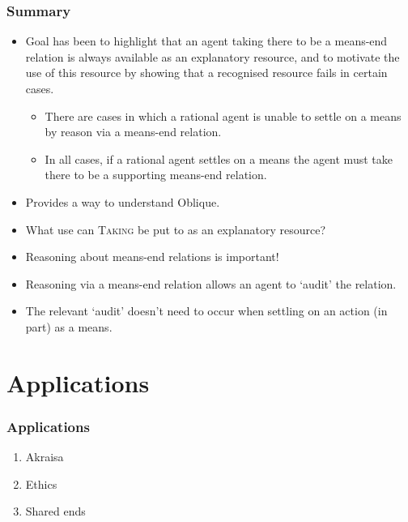 \documentclass[noamssymb,
graphics,
]{beamer} %
\newcommand{\schemaName}[1]{\textsc{#1}}
\newcommand{\hozlinedash}[0]{
  \noindent\hdashrule[0.5ex][c]{\textwidth}{.1pt}{2.5pt}
}
\begin{document}
\begin{frame}
  \frametitle{Summary}
  \begin{itemize}
  \item Goal has been to highlight that an agent taking there to be a means-end relation is always available as an explanatory resource, and to motivate the use of this resource by showing that a recognised resource fails in certain cases.
    \begin{itemize}
    \item There are cases in which a rational agent is unable to settle on a means by reason via a means-end relation.
    \item In all cases, if a rational agent settles on a means the agent must take there to be a supporting means-end relation.
    \end{itemize}
  \item Provides a way to understand Oblique.
  \item What use can \schemaName{Taking} be put to as an explanatory resource?
  \end{itemize}
  \hozlinedash
  \vspace{-15pt}
  \begin{itemize}
  \item Reasoning about means-end relations is important!
  \item Reasoning via a means-end relation allows an agent to `audit' the relation.
  \item The relevant `audit' doesn't need to occur when settling on an action (in part) as a means.
  \end{itemize}
\end{frame}

\section{Applications}
\label{sec:future-work}

\begin{frame}
  \frametitle{Applications}

  \begin{enumerate}
  \item Akraisa
  \item Ethics
  \item Shared ends
  \end{enumerate}
\end{frame}
\end{document}
